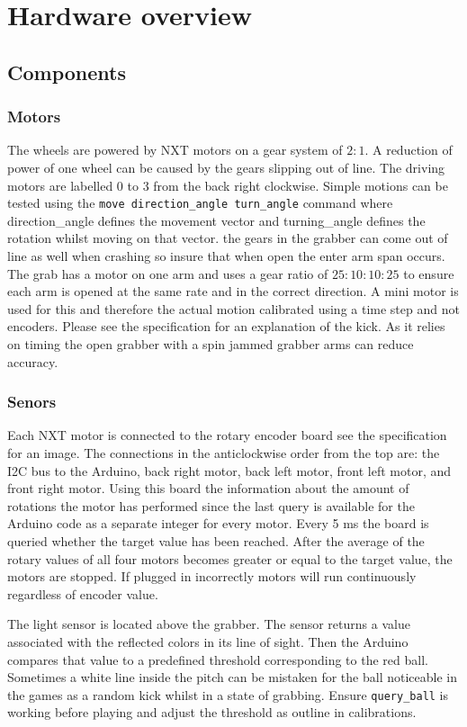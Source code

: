 \documentclass[a4paper,12pt]{article}
\begin{document}
\section{Hardware overview}

\subsection{Components}
\subsubsection{Motors}
The wheels are powered by NXT motors on a gear system of $2:1$. A reduction of power of one wheel can be caused by the gears slipping out of line. The driving motors are labelled 0 to 3 from the back right clockwise. Simple motions can be tested using the \texttt{move direction\_angle turn\_angle} command where direction\_angle defines the movement vector and turning\_angle defines the rotation whilst moving on that vector. the gears in the grabber can come out of line as well when crashing so insure that when open the enter arm span occurs. The grab has a motor on one arm and uses a gear ratio of $25:10:10:25$ to ensure each arm is opened at the same rate and in the correct direction. A mini motor is used for this and therefore the actual motion calibrated using a time step and not encoders. Please see the specification for an explanation of the kick. As it relies on timing the open grabber with a spin jammed grabber arms can reduce accuracy.

\subsubsection{Senors}

Each NXT motor is connected to the rotary encoder board see the specification for an image. The connections in the anticlockwise order from the top are: the I2C bus to the Arduino, back right motor, back left motor, front left motor, and front right motor. Using this board the information about the amount of rotations the motor has performed since the last query is available for the Arduino code as a separate integer for every motor. Every 5 ms the board is queried whether the target value has been reached. After the average of the rotary values of all four motors becomes greater or equal to the target value, the motors are stopped. If plugged in incorrectly motors will run continuously regardless of encoder value.

The light sensor is located above the grabber. The sensor returns a value associated with the reflected colors in its line of sight. Then the Arduino compares that value to a predefined threshold corresponding to the red ball. Sometimes a white line inside the pitch can be mistaken for the ball noticeable in the games as a random kick whilst in a state of grabbing. Ensure \texttt{query\_ball} is working before playing and adjust the threshold as outline in calibrations.
\end{document}
